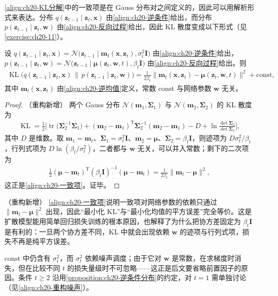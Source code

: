 \documentclass[../../main.tex]{subfiles}
\begin{document}
\eqref{align:ch20-KL分解}中的一致项是在 Gauss 分布对之间定义的，因此可以用解析形式来表达。分布 $q(\bm{z}_{t-1}\mid\bm{z}_t,\bm{x})$ 由\eqref{align:ch20-逆条件}给出，而分布 $p(\bm{z}_{t-1}\mid\bm{z}_t,\bm{w})$ 由\eqref{align:ch20-反向过程}给出，因此 KL 散度变成以下形式（见\cref{exercise:ch20-11}）。

\begin{proposition}[一致项的闭式表达]\label{proposition:ch20-一致项KL}
设 $q(\bm{z}_{t-1}\mid\bm{z}_t,\bm{x})=\mathcal{N}\big(\bm{z}_{t-1}\mid\bm{m}_t(\bm{x},\bm{z}_t),\sigma_t^2\bm{I}\big)$ 由\eqref{align:ch20-逆条件}给出，$p(\bm{z}_{t-1}\mid\bm{z}_t,\bm{w})=\mathcal{N}\big(\bm{z}_{t-1}\mid\bm{\mu}(\bm{z}_t,\bm{w},t),\beta_t\bm{I}\big)$ 由\eqref{align:ch20-反向过程}给出。则
\begin{align}
\operatorname{KL}\big(q(\bm{z}_{t-1}\mid\bm{z}_t,\bm{x})\,\|\,p(\bm{z}_{t-1}\mid\bm{z}_t,\bm{w})\big)=\frac{1}{2\beta_t}\big\|\bm{m}_t(\bm{x},\bm{z}_t)-\bm{\mu}(\bm{z}_t,\bm{w},t)\big\|^2+\mathrm{const},
\label{align:ch20-一致项}
\end{align}
其中 $\bm{m}_t(\bm{x},\bm{z}_t)$ 由\eqref{align:ch20-逆均值}定义，常数 $\mathrm{const}$ 与网络参数 $\bm{w}$ 无关。
\end{proposition}

\begin{proof}（重构新增）
两个 Gauss 分布 $\mathcal{N}(\bm{m}_1,\bm{\Sigma}_1)$ 与 $\mathcal{N}(\bm{m}_2,\bm{\Sigma}_2)$ 的 KL 散度为
\begin{align*}
\operatorname{KL}=\frac{1}{2}\Big[\operatorname{tr}\big(\bm{\Sigma}_2^{-1}\bm{\Sigma}_1\big)+(\bm{m}_2-\bm{m}_1)^{\mathsf T}\bm{\Sigma}_2^{-1}(\bm{m}_2-\bm{m}_1)-D+\ln\frac{\det\bm{\Sigma}_2}{\det\bm{\Sigma}_1}\Big],
\end{align*}
其中 $D$ 是维数。取 $\bm{m}_1=\bm{m}_t$、$\bm{\Sigma}_1=\sigma_t^2\bm{I}$、$\bm{m}_2=\bm{\mu}$、$\bm{\Sigma}_2=\beta_t\bm{I}$，则迹项为 $D\sigma_t^2/\beta_t$，行列式项为 $D\ln(\beta_t/\sigma_t^2)$，二者都与 $\bm{w}$ 无关，可以并入常数；剩下的二次项为
\begin{align*}
\frac{1}{2}(\bm{\mu}-\bm{m}_t)^{\mathsf T}(\beta_t\bm{I})^{-1}(\bm{\mu}-\bm{m}_t)=\frac{1}{2\beta_t}\|\bm{m}_t-\bm{\mu}\|^2,
\end{align*}
这正是\eqref{align:ch20-一致项}。证毕。
\end{proof}

\begin{remark}（重构新增）
\eqref{align:ch20-一致项}说明一致项对网络参数的依赖只通过 $\|\bm{m}_t-\bm{\mu}\|^2$ 出现，因此“最小化 KL”与“最小化均值的平方误差”完全等价。这是扩散模型能用简单回归损失训练的根本原因，也解释了为什么把协方差固定为 $\beta_t\bm{I}$ 是有利的：一旦两个协方差不同，KL 中就会出现依赖 $\bm{w}$ 的迹项与行列式项，损失不再是纯平方误差。\par
$\mathrm{const}$ 中仍含有 $\sigma_t^2$，而 $\sigma_t^2$ 依赖噪声调度；由于它对 $\bm{w}$ 是常数，在求梯度时消失，但在比较不同 $t$ 的损失量级时不可忽略——这正是后文要省略前置因子的原因。条件 $t\geqslant2$ 沿用\cref{proposition:ch20-逆条件分布}的约定，对 $t=1$ 需单独讨论（见\eqref{align:ch20-重构噪声}）。
\end{remark}
\end{document}
